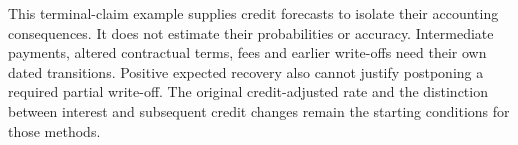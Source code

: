 This terminal-claim example supplies credit forecasts to isolate their
accounting consequences. It does not estimate their probabilities or accuracy.
Intermediate payments, altered contractual terms, fees and earlier write-offs
need their own dated transitions. Positive expected recovery also cannot
justify postponing a required partial write-off. The original credit-adjusted
rate and the distinction between interest
and subsequent credit changes remain the starting conditions for those methods.
